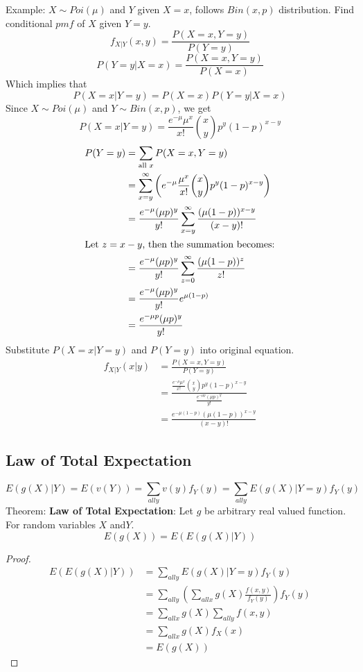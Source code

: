 \documentclass{article}
\begin{document}
\noindent Example: $X \sim Poi(\mu)$ and $Y$ given $X=x$, follows  $Bin(x,p)$ distribution. Find conditional $pmf$ of $X$ given $Y = y$.
$$f_{X|Y}(x,y) = \frac{P(X=x, Y=y)}{P(Y=y)}$$
$$P(Y=y|X=x) = \frac{P(X=x, Y=y)}{P(X=x)}$$
Which implies that
$$P(X=x|Y=y) = P(X=x)P(Y=y|X=x)$$
Since $X\sim Poi(\mu)$ and $Y \sim Bin(x, p)$, we get 
$$P(X=x|Y=y) = \frac{e^{-\mu}\mu^x}{x!}\binom{x}{y}p^y(1-p)^{x-y}$$
\begin{align*}
    P(Y=y) &= \sum_{\text{all } x} P(X=x, Y=y) \\
    &= \sum_{x=y}^{\infty} \left( e^{-\mu} \frac{\mu^x}{x!} \binom{x}{y} p^y (1-p)^{x-y} \right) \\
    &= \frac{e^{-\mu} (\mu p)^y}{y!} \sum_{x=y}^{\infty} \frac{(\mu(1-p))^{x-y}}{(x-y)!} \\
    \intertext{Let $z = x - y$, then the summation becomes:}
    &= \frac{e^{-\mu} (\mu p)^y}{y!} \sum_{z=0}^{\infty} \frac{(\mu(1-p))^z}{z!} \\
    &= \frac{e^{-\mu} (\mu p)^y}{y!} e^{\mu(1-p)} \\
    &= \frac{e^{-\mu p} (\mu p)^y}{y!}
\end{align*}
Substitute $P(X=x|Y=y)$ and $P(Y=y)$ into original equation.
\begin{align*}
    f_{X|Y}(x|y) &= \frac{P(X=x, Y=y)}{P(Y=y)} \\
                 &= \frac{\displaystyle \frac{e^{-\mu}\mu^x}{x!} \binom{x}{y} p^y (1-p)^{x-y}}{\displaystyle \frac{e^{-\mu p} (\mu p)^y}{y!}}\\
                 &= \frac{e^{-\mu(1-p)}(\mu(1-p))^{x-y}}{(x-y)!}
\end{align*}

\subsection{Law of Total Expectation}
$$E(g(X)|Y) = E(v(Y)) = \sum_{all y}v(y)f_Y(y) = \sum_{all y}E(g(X)|Y = y)f_Y(y)$$
Theorem: \textbf{Law of Total Expectation}:
Let $g$ be arbitrary real valued function. For random variables $X$ and$Y$. 
$$E(g(X)) = E(E(g(X)|Y))$$
\begin{proof}  
\begin{align*}
    E(E(g(X)|Y)) &= \sum_{all y}E(g(X)|Y=y)f_Y(y)\\
&= \sum_{all y} \left(\sum_{all x} g(X)\frac{f(x,y)}{f_Y(y)}\right) f_Y(y)\\
&= \sum_{all x} g(X)\sum_{all y} f(x, y) \\
&= \sum_{all x} g(X)f_X(x)\\
&=E(g(X))
\end{align*}
\end{proof}
\end{document}
